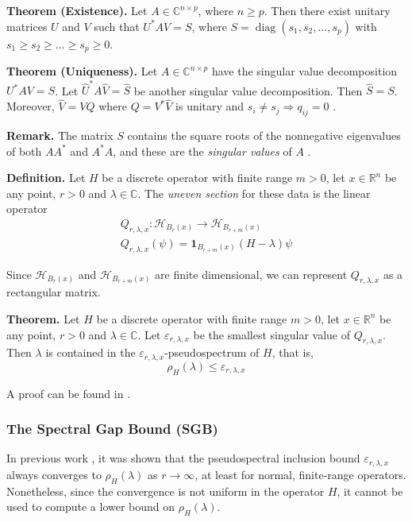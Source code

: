 \documentclass[11pt]{article}
\DeclareMathOperator{\diag}{diag}
\begin{document}
\textbf{Theorem (Existence).} Let $A \in \mathbb{C}^{n \times p}$, where $n \geq p$. Then there exist unitary matrices $U$ and $V$ such that $U^*AV = S$, where $S = \diag(s_1, s_2, \dots, s_p)$ with $s_1 \geq s_2 \geq \dots \geq s_p \geq 0$. 

\textbf{Theorem (Uniqueness).} Let $A \in \mathbb{C}^{n \times p}$ have the singular value decomposition $U^*AV = S$. Let $\hat{U}^*A\hat{V} = \hat{S}$ be another singular value decomposition. Then $\hat{S} = S$. Moreover, $\hat{V} = VQ$ where $Q = V^*\hat{V}$ is unitary and $s_i \neq s_j \Rightarrow q_{ij} = 0$ \cite{matrixalgorithms}.

\textbf{Remark.} The matrix $S$ contains the square roots of the nonnegative eigenvalues of both $AA^*$ and $A^*A$, and these are the \textit{singular values} of $A$ \cite{gilbertstrang}.

\textbf{Definition.} Let $H$ be a discrete operator with finite range $m > 0$, let $x \in \mathbb{R}^n$ be any point, $r > 0$ and $\lambda \in \mathbb{C}$. The \textit{uneven section} for these data is the linear operator
\begin{gather*}
    Q_{r, \lambda, x}: \mathcal{H}_{B_r(x)} \rightarrow \mathcal{H}_{B_{r + m}(x)} \\
    Q_{r, \lambda, x} (\psi) = \mathbf{1}_{B_{r + m}(x)} \left( H - \lambda \right) \psi
\end{gather*}

Since $\mathcal{H}_{B_r(x)}$ and $\mathcal{H}_{B_{r + m}(x)}$ are finite dimensional, we can represent $Q_{r, \lambda, x}$ as a rectangular matrix.

\textbf{Theorem.} Let $H$ be a discrete operator with finite range $m > 0$, let $x \in \mathbb{R}^n$ be any point, $r > 0$ and $\lambda \in \mathbb{C}$. Let $\varepsilon_{r, \lambda, x}$ be the smallest singular value of $Q_{r, \lambda, x}$. Then $\lambda$ is contained in the $\varepsilon_{r, \lambda, x}$-pseudospectrum of $H$, that is,
\begin{equation} \label{eq:upper_bound}
    \rho_H (\lambda) \leq \varepsilon_{r, \lambda, x}
\end{equation}

A proof can be found in \cite{paulhege2025}.

\subsubsection{The Spectral Gap Bound (SGB)}

In previous work \cite{computespectra}, it was shown that the pseudospectral inclusion bound $\varepsilon_{r, \lambda, x}$ always converges to $\rho_H (\lambda)$ as $r \rightarrow \infty$, at least for normal, finite-range operators. Nonetheless, since the convergence is not uniform in the operator $H$, it cannot be used to compute a lower bound on $\rho_H (\lambda)$.
\end{document}
